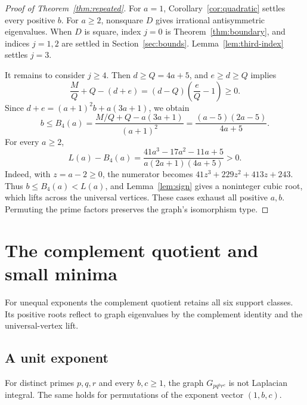\begin{proof}[Proof of Theorem~\ref{thm:repeated}]
For $a=1$, Corollary~\ref{cor:quadratic} settles every positive $b$.
For $a\geq2$, nonsquare $D$ gives irrational antisymmetric eigenvalues.
When $D$ is square, index $j=0$ is Theorem~\ref{thm:boundary},
and indices $j=1,2$ are settled in Section~\ref{sec:bounds}.
Lemma~\ref{lem:third-index} settles $j=3$.

It remains to consider $j\geq4$. Then $d\geq Q=4a+5$, and
$e\geq d\geq Q$ implies
\[
\frac MQ+Q-(d+e)=(d-Q)\left(\frac eQ-1\right)\geq0.
\]
Since $d+e=(a+1)^2b+a(3a+1)$, we obtain
\[
b\leq B_4(a)=\frac{M/Q+Q-a(3a+1)}{(a+1)^2}
=\frac{(a-5)(2a-5)}{4a+5}.
\]
For every $a\geq2$,
\[
L(a)-B_4(a)=
\frac{41a^3-17a^2-11a+5}{a(2a+1)(4a+5)}>0.
\]
Indeed, with $z=a-2\geq0$, the numerator becomes
$41z^3+229z^2+413z+243$. Thus $b\leq B_4(a)<L(a)$, and
Lemma~\ref{lem:sign} gives a noninteger cubic root, which lifts across
the universal vertices. These cases exhaust all positive $a,b$.
Permuting the prime factors preserves the graph's isomorphism type.
\end{proof}

\section{The complement quotient and small minima}
\label{sec:unit}
For unequal exponents the complement quotient retains all six support
classes. Its positive roots reflect to graph eigenvalues by the complement
identity and the universal-vertex lift.

\subsection{A unit exponent}

\begin{theorem}
\label{thm:unit}
For distinct primes $p,q,r$ and every $b,c\geq1$, the graph
$G_{p q^b r^c}$ is not Laplacian integral. The same holds for
permutations of the exponent vector $(1,b,c)$.
\end{theorem}

